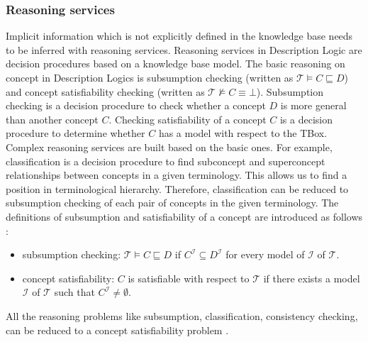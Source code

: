 \documentclass{article}
\begin{document}
\subsubsection{Reasoning services}
Implicit information which is not explicitly defined in the knowledge base needs to be inferred with reasoning services.
Reasoning services in Description Logic are decision procedures based on a knowledge base model. 
The basic reasoning on concept in Description Logics is subsumption checking (written as $\mathcal{T}\vDash C\sqsubseteq D$) and 
concept satisfiability checking (written as $\mathcal{T}\nvDash C\equiv \bot$).
Subsumption checking is a decision procedure to check whether a concept $D$ is more general than another concept $C$.
Checking satisfiability of a concept $C$ is a decision procedure to determine whether $C$ has a model with respect to the TBox.
Complex reasoning services are built based on the basic ones. For example, classification is a decision procedure  to find subconcept and superconcept 
relationships between concepts in a given terminology. This allows us to find a position in terminological hierarchy.
Therefore, classification can be reduced to subsumption checking of each pair of concepts in the given terminology.
The definitions of subsumption and satisfiability of a concept are introduced as follows \cite{baader2003description}:
\begin{itemize}
\item subsumption checking: $\mathcal{T}\vDash C\sqsubseteq D$ if $C^\mathcal{I}\subseteq D^\mathcal{I}$ for every model of $\mathcal{I}$ of $\mathcal{T}$.
\item concept satisfiability: $C$ is satisfiable with respect to $\mathcal{T}$ if there exists a model $\mathcal{I}$ of $\mathcal{T}$ such that $C^\mathcal{I}\neq \emptyset$.
\end{itemize}
All the reasoning problems like subsumption, classification, consistency checking, can be reduced to a concept satisfiability problem \cite{baader2003description}.
\end{document}
